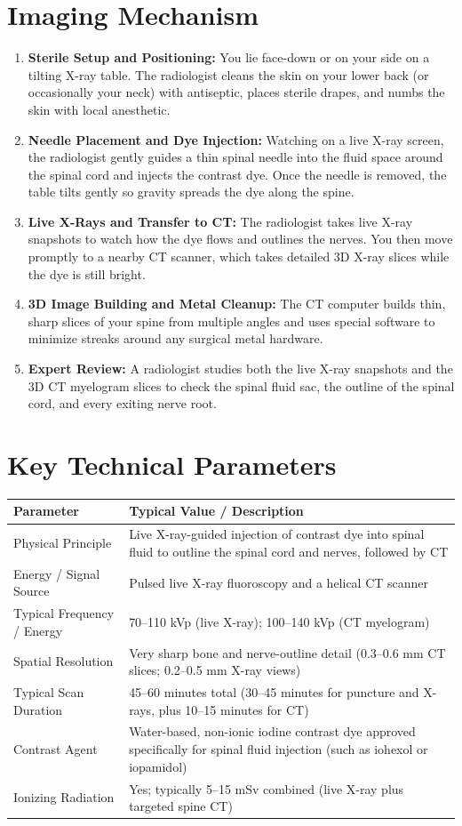 \section{Imaging Mechanism}
\begin{enumerate}
    \item \textbf{Sterile Setup and Positioning:} You lie face-down or on your side on a tilting X-ray table. The radiologist cleans the skin on your lower back (or occasionally your neck) with antiseptic, places sterile drapes, and numbs the skin with local anesthetic.
    \item \textbf{Needle Placement and Dye Injection:} Watching on a live X-ray screen, the radiologist gently guides a thin spinal needle into the fluid space around the spinal cord and injects the contrast dye. Once the needle is removed, the table tilts gently so gravity spreads the dye along the spine.
    \item \textbf{Live X-Rays and Transfer to CT:} The radiologist takes live X-ray snapshots to watch how the dye flows and outlines the nerves. You then move promptly to a nearby CT scanner, which takes detailed 3D X-ray slices while the dye is still bright.
    \item \textbf{3D Image Building and Metal Cleanup:} The CT computer builds thin, sharp slices of your spine from multiple angles and uses special software to minimize streaks around any surgical metal hardware.
    \item \textbf{Expert Review:} A radiologist studies both the live X-ray snapshots and the 3D CT myelogram slices to check the spinal fluid sac, the outline of the spinal cord, and every exiting nerve root.
\end{enumerate}

\section{Key Technical Parameters}
\noindent
\begin{tabularx}{\textwidth}{@{}l X@{}}
\toprule
\textbf{Parameter} & \textbf{Typical Value / Description} \\
\midrule
Physical Principle & Live X-ray-guided injection of contrast dye into spinal fluid to outline the spinal cord and nerves, followed by CT \\
Energy / Signal Source & Pulsed live X-ray fluoroscopy and a helical CT scanner \\
Typical Frequency / Energy & 70--110 kVp (live X-ray); 100--140 kVp (CT myelogram) \\
Spatial Resolution & Very sharp bone and nerve-outline detail (0.3--0.6 mm CT slices; 0.2--0.5 mm X-ray views) \\
Typical Scan Duration & 45--60 minutes total (30--45 minutes for puncture and X-rays, plus 10--15 minutes for CT) \\
Contrast Agent & Water-based, non-ionic iodine contrast dye approved specifically for spinal fluid injection (such as iohexol or iopamidol) \\
Ionizing Radiation & Yes; typically 5--15 mSv combined (live X-ray plus targeted spine CT) \\
\bottomrule
\end{tabularx}

